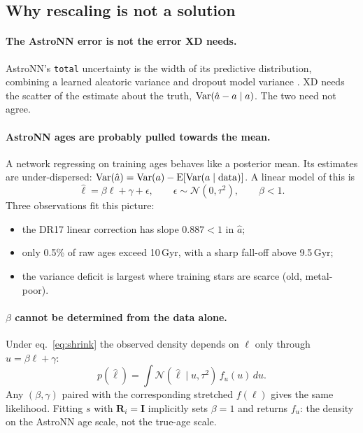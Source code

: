 \documentclass[11pt,a4paper]{article}
\newcommand{\N}{\ensuremath{\mathcal{N}}}
\begin{document}
\subsection{Why rescaling is not a solution}
\label{sec:degeneracy}
\paragraph{The AstroNN error is not the error XD needs.}
AstroNN's \texttt{total} uncertainty is the width of its predictive distribution, combining a learned aleatoric variance and dropout model variance \citep{Leung2019}. XD needs the scatter of the estimate about the truth, ${\rm Var}(\hat a-a\mid a)$. The two need not agree.

\paragraph{AstroNN ages are probably pulled towards the mean.}
A network regressing on training ages \citep[APOKASC-2;][]{Pinsonneault2018} behaves like a posterior mean. Its estimates are under-dispersed: ${\rm Var}(\hat a)={\rm Var}(a)-{\rm E}[{\rm Var}(a\mid{\rm data})]$. A linear model of this is
\begin{equation}
\hat\ell=\beta\ell+\gamma+\epsilon,\qquad\epsilon\sim\N(0,\tau^2),\qquad\beta<1 .
\label{eq:shrink}
\end{equation}
Three observations fit this picture:
\begin{itemize}
  \item the DR17 linear correction has slope $0.887<1$ in $\hat a$;
  \item only 0.5\% of raw ages exceed 10\,Gyr, with a sharp fall-off above 9.5\,Gyr;
  \item the variance deficit is largest where training stars are scarce (old, metal-poor).
\end{itemize}

\paragraph{$\beta$ cannot be determined from the data alone.}
Under eq.~\eqref{eq:shrink} the observed density depends on $\ell$ only through $u=\beta\ell+\gamma$:
\[
p(\hat\ell)=\int\N(\hat\ell\mid u,\tau^2)\,f_u(u)\,du .
\]
Any $(\beta,\gamma)$ paired with the corresponding stretched $f(\ell)$ gives the same likelihood. Fitting $s$ with $\mathbf R_i=\mathbf I$ implicitly sets $\beta=1$ and returns $f_u$: the density on the AstroNN age scale, not the true-age scale.
\end{document}
